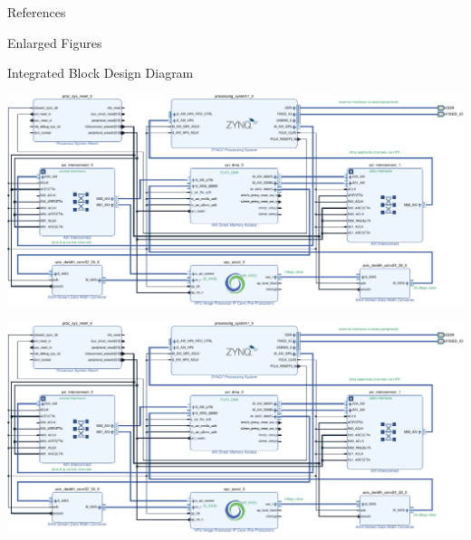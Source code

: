 \documentclass{matthijs}
\begin{document}
	\begin{hoofdstuk}{References}

		\printbibliography[heading=none]

	\end{hoofdstuk}


	\begin{appendices}
		\begin{hoofdstuk}{Enlarged Figures}
			\begin{paragraaf}{Integrated Block Design Diagram}
				\vspace{0.25cm}
				\centerline{\includegraphics[angle=90, origin=c, clip, trim=9.45cm 0 0 0, width=1.25\textwidth]{hw-block-diagram-crop-asset.pdf}}
				\clearpage
				\centerline{\includegraphics[angle=90, origin=c, clip, trim=0 0 9.45cm 0, width=1.25\textwidth]{hw-block-diagram-crop-asset.pdf}}
			\end{paragraaf}
		\end{hoofdstuk}
	\end{appendices}

	\clearpage
	\thispagestyle{empty}
	\addtocounter{page}{-1}
	\
	\clearpage
\end{document}
